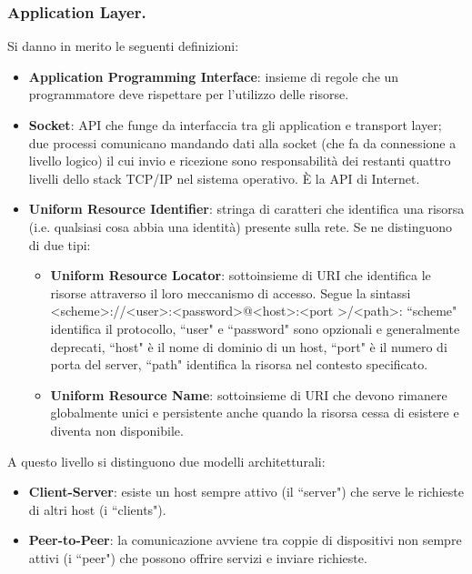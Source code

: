 \documentclass[11pt, italian, openany]{book}
\begin{document}
\begin{sloppypar}
\subsubsection*{Application Layer.}
Si danno in merito le seguenti definizioni:
\begin{itemize}[topsep=0pt]
	\itemsep-0.3em
	\item \textbf{Application Programming Interface}: insieme di regole che un programmatore deve rispettare per l'utilizzo delle risorse.
	\item \textbf{Socket}: API che funge da interfaccia tra gli application e transport layer; due processi comunicano mandando dati alla socket (che
	fa da connessione a livello logico) il cui invio e ricezione sono responsabilit\`a dei restanti quattro livelli dello stack TCP/IP nel sistema
	operativo. \`E la API di Internet.
	\item \textbf{Uniform Resource Identifier}: stringa di caratteri che identifica una risorsa (i.e. qualsiasi cosa abbia una identit\`a) presente
	sulla rete. Se ne distinguono di due tipi:
	\vspace{-3.5mm}
	\begin{itemize}
		\itemsep-0.3em
		\item \textbf{Uniform Resource Locator}: sottoinsieme di URI che identifica le risorse attraverso il loro meccanismo di accesso. Segue la sintassi
		\textless{scheme}\textgreater{://}\textless{user}\textgreater{:}\textless{password}\textgreater{@}\textless{host}\textgreater{:}\textless{port}
		\textgreater{/}\textless{path}\textgreater:
		``scheme" identifica il protocollo, ``user" e ``password" sono opzionali e generalmente deprecati, ``host" \`e il nome di dominio di un host,
		``port" \`e il numero di porta del server, ``path" identifica la risorsa nel contesto specificato.
		\item \textbf{Uniform Resource Name}: sottoinsieme di URI che devono rimanere globalmente unici e persistente anche quando la risorsa cessa di
		esistere e diventa non disponibile.
	\end{itemize}
\end{itemize}

A questo livello si distinguono due modelli architetturali:
\begin{itemize}[topsep=0pt]
	\itemsep-0.3em
	\item \textbf{Client-Server}: esiste un host sempre attivo (il ``server") che serve le richieste di altri host (i ``clients").
	\item \textbf{Peer-to-Peer}: la comunicazione avviene tra coppie di dispositivi non sempre attivi (i ``peer") che possono offrire servizi e inviare
	richieste.
\end{itemize}


\end{sloppypar}
\end{document}
